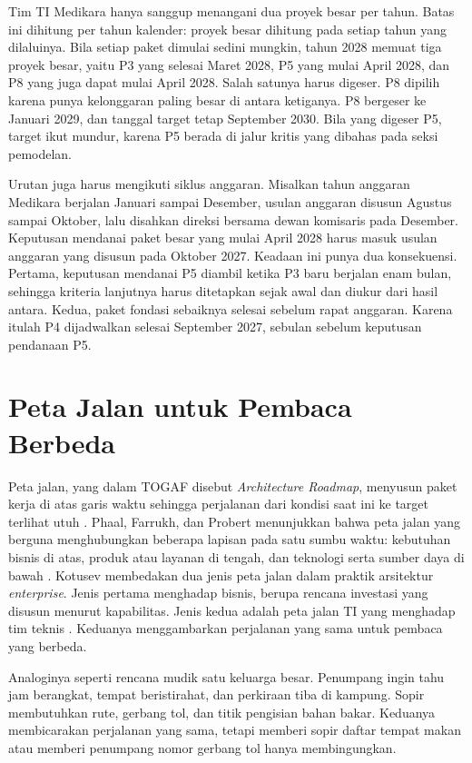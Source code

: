 Tim TI Medikara hanya sanggup menangani dua proyek besar per tahun. Batas ini
dihitung per tahun kalender: proyek besar dihitung pada setiap tahun yang
dilaluinya. Bila setiap paket dimulai sedini mungkin, tahun 2028 memuat tiga
proyek besar, yaitu P3 yang selesai Maret 2028, P5 yang mulai April 2028, dan
P8 yang juga dapat mulai April 2028. Salah satunya harus digeser. P8 dipilih
karena punya kelonggaran paling besar di antara ketiganya. P8 bergeser ke
Januari 2029, dan tanggal target tetap September 2030. Bila yang digeser P5,
target ikut mundur, karena P5 berada di jalur kritis yang dibahas pada seksi
pemodelan.

Urutan juga harus mengikuti siklus anggaran. Misalkan tahun anggaran Medikara
berjalan Januari sampai Desember, usulan anggaran disusun Agustus sampai
Oktober, lalu disahkan direksi bersama dewan komisaris pada Desember. Keputusan
mendanai paket besar yang mulai April 2028 harus masuk usulan anggaran yang
disusun pada Oktober 2027. Keadaan ini punya dua konsekuensi. Pertama, keputusan
mendanai P5 diambil ketika P3 baru berjalan enam bulan, sehingga kriteria
lanjutnya harus ditetapkan sejak awal dan diukur dari hasil antara. Kedua,
paket fondasi sebaiknya selesai sebelum rapat anggaran. Karena itulah P4
dijadwalkan selesai September 2027, sebulan sebelum keputusan pendanaan P5.

\section{Peta Jalan untuk Pembaca Berbeda}

Peta jalan, yang dalam TOGAF disebut \textit{Architecture Roadmap}, menyusun
paket kerja di atas garis waktu sehingga perjalanan dari kondisi saat ini ke
target terlihat utuh \cite{togaf10}. Phaal, Farrukh, dan Probert menunjukkan
bahwa peta jalan yang berguna menghubungkan beberapa lapisan pada satu sumbu
waktu: kebutuhan bisnis di atas, produk atau layanan di tengah, dan teknologi
serta sumber daya di bawah \cite{c12-phaal2004}. Kotusev membedakan dua jenis
peta jalan dalam praktik arsitektur \textit{enterprise}. Jenis pertama menghadap bisnis, berupa rencana
investasi yang disusun menurut kapabilitas. Jenis kedua adalah peta jalan TI
yang menghadap tim teknis \cite{kotusev2021}. Keduanya menggambarkan perjalanan
yang sama untuk pembaca yang berbeda.

Analoginya seperti rencana mudik satu keluarga besar. Penumpang ingin tahu jam
berangkat, tempat beristirahat, dan perkiraan tiba di kampung. Sopir
membutuhkan rute, gerbang tol, dan titik pengisian bahan bakar. Keduanya
membicarakan perjalanan yang sama, tetapi memberi sopir daftar tempat makan
atau memberi penumpang nomor gerbang tol hanya membingungkan.

